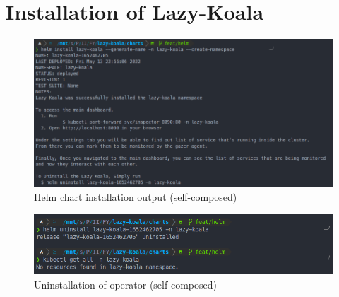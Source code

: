 \chapter{Installation of Lazy-Koala}\label{appendix:helm}

\begin{figure}[H]
    \includegraphics[width=16.5cm]{assets/appendix/helm-install.png}
    \caption{Helm chart installation output (self-composed)}
\end{figure}


\begin{figure}[H]
    \includegraphics[width=16.5cm]{assets/appendix/helm-uninstall.png}
    \caption{Uninstallation of operator (self-composed)}
\end{figure}